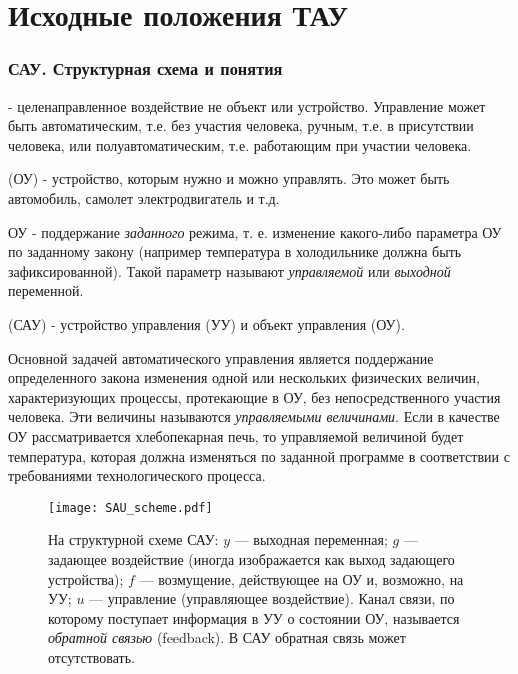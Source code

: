 \documentclass[../../TAU.tex]{subfiles}
\begin{document}
\section{Исходные положения ТАУ}
\subsubsection{САУ. Структурная схема и понятия}

     - целенаправленное воздействие не объект или устройство. Управление может быть автоматическим, т.е. без участия человека, ручным, т.е. в присутствии человека, или полуавтоматическим, т.е. работающим при участии человека.

     (ОУ) - устройство, которым нужно и можно управлять. Это может быть автомобиль, самолет электродвигатель и т.д.

     ОУ - поддержание 
    \textit{заданного} 
    режима, т. е. изменение какого-либо параметра ОУ по заданному закону (например температура в холодильнике должна быть зафиксированной). Такой параметр называют 
    \textit{управляемой} или 
    \textit{выходной} переменной. 

     (САУ) - устройство управления (УУ) и объект управления (ОУ).\par
    Основной задачей автоматического управления является поддержание определенного закона изменения одной или нескольких физических величин, характеризующих процессы, протекающие в ОУ, без непосредственного участия человека. Эти величины называются {\it управляемыми величинами}. Если в качестве ОУ рассматривается хлебопекарная печь, то управляемой величиной будет температура, которая должна изменяться по заданной программе в соответствии с требованиями технологического процесса. 



\begin{figure}[h]
    \centering
    \texttt{[image: SAU\_scheme.pdf]}
    \caption{На структурной схеме САУ: $y$ --- выходная переменная; $g$ --- задающее воздействие (иногда изображается как выход задающего устройства); $f$ --- возмущение, действующее на ОУ и, возможно, на УУ; $u$ --- управление (управляющее воздействие). Канал связи, по которому поступает информация в УУ о состоянии ОУ, называется {\it обратной связью} (feedback). В САУ обратная связь может отсутствовать.}

\end{figure}
\end{document}
